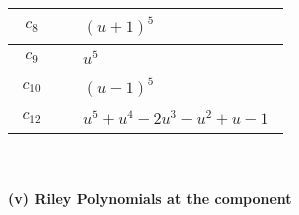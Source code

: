 \documentclass[1p]{elsarticle_modified}
\theoremstyle{definition}
\begin{document}
\begin{tabular}{m{50pt}|m{274pt}}
\hline $$\begin{aligned}c_{8}\end{aligned}$$&$\begin{aligned}
&(u+1)^5
\end{aligned}$\\
\hline $$\begin{aligned}c_{9}\end{aligned}$$&$\begin{aligned}
&u^5
\end{aligned}$\\
\hline $$\begin{aligned}c_{10}\end{aligned}$$&$\begin{aligned}
&(u-1)^5
\end{aligned}$\\
\hline $$\begin{aligned}c_{12}\end{aligned}$$&$\begin{aligned}
&u^5+u^4-2 u^3- u^2+u-1
\end{aligned}$\\
\hline
\end{tabular}\\~\\
\newpage\renewcommand{\arraystretch}{1}
\flushleft \textbf{(v) Riley Polynomials at the component}\newline \\
\end{document}
